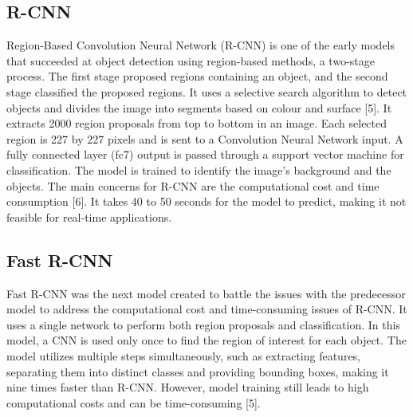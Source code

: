 \documentclass[conference]{IEEEtran}
\begin{document}
    \subsection{R-CNN}
    Region-Based Convolution Neural Network (R-CNN) is one of the early models that succeeded at object detection using region-based methods, a 
    two-stage process. The first stage proposed regions containing an object, and the second stage classified the proposed regions. It uses a 
    selective search algorithm to detect objects and divides the image into segments based on colour and surface [5]. It extracts 2000 region 
    proposals from top to bottom in an image. Each selected region is 227 by 227 pixels and is sent to a Convolution Neural Network input. 
    A fully connected layer (fc7) output is passed through a support vector machine for classification. The model is trained to identify the 
    image's background and the objects. The main concerns for R-CNN are the computational cost and time consumption [6]. It takes 40 to 50 
    seconds for the model to predict, making it not feasible for real-time applications. \\

    \subsection{Fast R-CNN}
    Fast R-CNN was the next model created to battle the issues with the predecessor model to address the computational cost and time-consuming issues of R-CNN. 
    It uses a single network to perform both region proposals and classification. In this model, a CNN is used only once to find the region of interest for each object. 
    The model utilizes multiple steps simultaneously, such as extracting features, separating them into distinct classes and providing bounding boxes, making it 
    nine times faster than R-CNN. However, model training still leads to high computational costs and can be time-consuming [5]. \\
\end{document}
